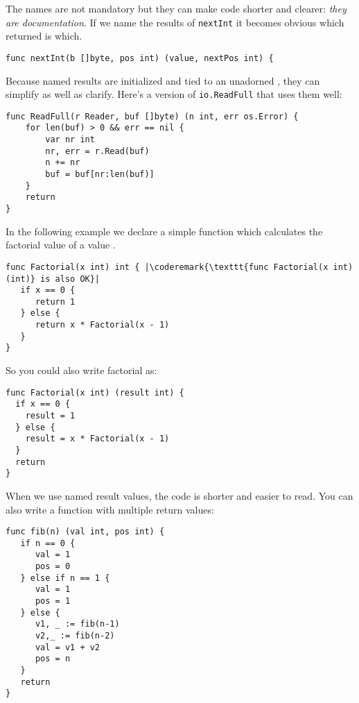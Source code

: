 The names are not mandatory but they can make code shorter and clearer:
\emph{they are documentation}. 
If we name the results of \lstinline{nextInt} it becomes obvious which
returned  is which.

\begin{lstlisting}
func nextInt(b []byte, pos int) (value, nextPos int) {
\end{lstlisting}
Because named results are initialized and tied to an unadorned
,
they can simplify as well as clarify. Here's a version of
\lstinline{io.ReadFull} that uses them well:

\begin{lstlisting}
func ReadFull(r Reader, buf []byte) (n int, err os.Error) {
    for len(buf) > 0 && err == nil {
        var nr int
        nr, err = r.Read(buf)
        n += nr
        buf = buf[nr:len(buf)]
    }
    return
}
\end{lstlisting}

In the following example we declare a simple function which calculates
the factorial value of a value .

\begin{lstlisting}
func Factorial(x int) int { |\coderemark{\texttt{func Factorial(x int) (int)} is also OK}|
   if x == 0 {
      return 1
   } else {
      return x * Factorial(x - 1)
   }
}
\end{lstlisting}
So you could also write factorial as:
\begin{lstlisting}
func Factorial(x int) (result int) {
  if x == 0 {
    result = 1	
  } else {
    result = x * Factorial(x - 1)
  }
  return
}
\end{lstlisting}
When we use named result values, the code is shorter and
easier to read.
You can also write a function with multiple return values:
\begin{lstlisting}
func fib(n) (val int, pos int) {
   if n == 0 {
      val = 1
      pos = 0
   } else if n == 1 {
      val = 1
      pos = 1
   } else {
      v1, _ := fib(n-1)
      v2,_ := fib(n-2)
      val = v1 + v2
      pos = n
   }
   return
}
\end{lstlisting}

